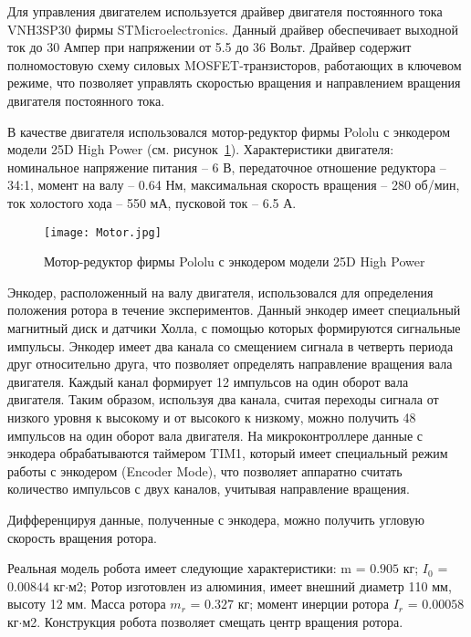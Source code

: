 Для управления двигателем используется драйвер двигателя постоянного тока VNH3SP30 фирмы STMicroelectronics. Данный драйвер обеспечивает выходной ток до 30 Ампер при напряжении от 5.5 до 36 Вольт. Драйвер содержит полномостовую схему силовых MOSFET-транзисторов, работающих в ключевом режиме, что позволяет управлять скоростью вращения и направлением вращения двигателя постоянного тока.

В качестве двигателя использовался мотор-редуктор фирмы Pololu с энкодером модели 25D High Power (см. рисунок~\ref{Motor}). Характеристики двигателя: номинальное напряжение питания -- 6 В, передаточное отношение редуктора -- 34:1, момент на валу -- 0.64 Нм, максимальная скорость вращения -- 280 об/мин, ток холостого хода -- 550 мА, пусковой ток -- 6.5 А. 

\begin{figure}[h]
	\centering
	\texttt{[image: Motor.jpg]}%
	\caption{Мотор-редуктор фирмы Pololu с энкодером модели 25D High Power}
	\label{Motor}
\end{figure}


Энкодер, расположенный на валу двигателя, использовался для определения положения ротора в течение экспериментов. Данный энкодер имеет специальный магнитный диск и датчики Холла, с помощью которых формируются сигнальные импульсы. Энкодер имеет два канала со смещением сигнала в четверть периода друг относительно друга, что позволяет определять направление вращения вала двигателя. Каждый канал формирует 12 импульсов на один оборот вала двигателя. Таким образом, используя два канала, считая переходы сигнала от низкого уровня к высокому и от высокого к низкому, можно получить 48 импульсов на один оборот вала двигателя. На микроконтроллере данные с энкодера обрабатываются таймером TIM1, который имеет специальный режим работы с энкодером (Encoder Mode), что позволяет аппаратно считать количество импульсов с двух каналов, учитывая направление вращения. 

Дифференцируя данные, полученные с энкодера, можно получить угловую скорость вращения ротора.






Реальная модель робота имеет следующие характеристики: m = $0.905$ кг; $I_0$ = $0.00844$ кг$\cdot$м2; Ротор изготовлен из алюминия, имеет внешний диаметр 110 мм, высоту 12 мм. Масса ротора $m_r$ = $0.327$ кг; момент инерции ротора $I_r$ = $0.00058$ кг$\cdot$м2. Конструкция робота позволяет смещать центр вращения ротора.

